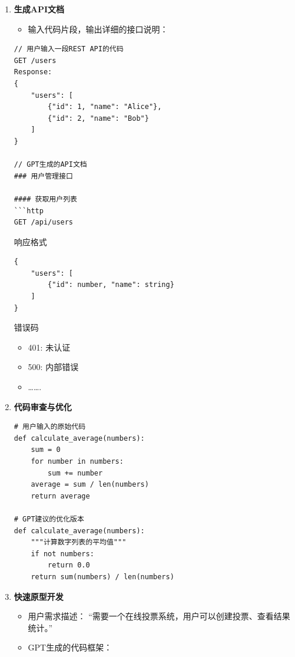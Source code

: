 \begin{enumerate}
\def\labelenumi{\arabic{enumi}.}
\item
  \textbf{生成API文档}

\begin{itemize}
  \item
    输入代码片段，输出详细的接口说明：
\end{itemize}

\begin{lstlisting}
// 用户输入一段REST API的代码
GET /users
Response:
{
    "users": [
        {"id": 1, "name": "Alice"},
        {"id": 2, "name": "Bob"}
    ]
}

// GPT生成的API文档
### 用户管理接口

#### 获取用户列表
```http
GET /api/users
\end{lstlisting}

    响应格式

\begin{lstlisting}
{
    "users": [
        {"id": number, "name": string}
    ]
}
\end{lstlisting}

    错误码

\begin{itemize}
    \item
      401: 未认证
    \item
      500: 内部错误
    \item
      \ldots{}\ldots{}.
\end{itemize}

\item
  \textbf{代码审查与优化}

\begin{lstlisting}
# 用户输入的原始代码
def calculate_average(numbers):
    sum = 0
    for number in numbers:
        sum += number
    average = sum / len(numbers)
    return average

# GPT建议的优化版本
def calculate_average(numbers):
    """计算数字列表的平均值"""
    if not numbers:
        return 0.0
    return sum(numbers) / len(numbers)
\end{lstlisting}
\item
  \textbf{快速原型开发}

  \begin{itemize}
  \item
    用户需求描述：
    ``需要一个在线投票系统，用户可以创建投票、查看结果统计。''
  \item
    GPT生成的代码框架：


\end{itemize}
\end{enumerate}
